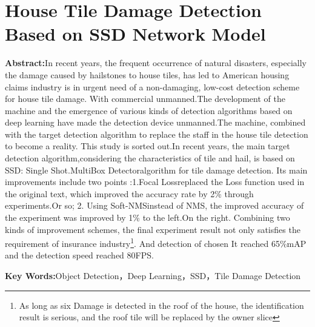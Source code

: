 \section*{House Tile Damage Detection Based on SSD Network Model}
\par \noindent
\textbf{\songti {}Abstract:}In recent years, the frequent occurrence of natural disasters, especially the damage caused by hailstones to house tiles, has led to American housing claims industry is in urgent need of a non-damaging, low-cost detection scheme for house tile damage. With commercial unmanned.The development of the machine and the emergence of various kinds of detection algorithms based on deep learning have made the detection device unmanned.The machine, combined with the target detection algorithm to replace the staff in the house tile detection to become a reality. This study is sorted out.In recent years, the main target detection algorithm,considering the characteristics of tile and hail, is based on SSD: Single Shot.MultiBox Detector\cite{ssd}algorithm for tile damage detection. Its main improvements include two points :1.Focal Loss\cite{focal-loss}replaced the Loss function used in the original text, which improved the accuracy rate by 2\% through experiments.Or so; 2. Using Soft-NMS\cite{soft-nms}instead of NMS, the improved accuracy of the experiment was improved by 1\% to the left.On the right. Combining two kinds of improvement schemes, the final experiment result not only satisfies the requirement of insurance industry\footnote{As long as six Damage is detected in the roof of the house, the identification result is serious, and the roof tile will be replaced by the owner slice}. And detection of chosen It reached 65\%mAP and the detection speed reached 80FPS.~\\

\par \noindent
\textbf{\songti {}Key Words:}{\kaishu {}Object Detection，Deep Learning，SSD，Tile Damage Detection}
